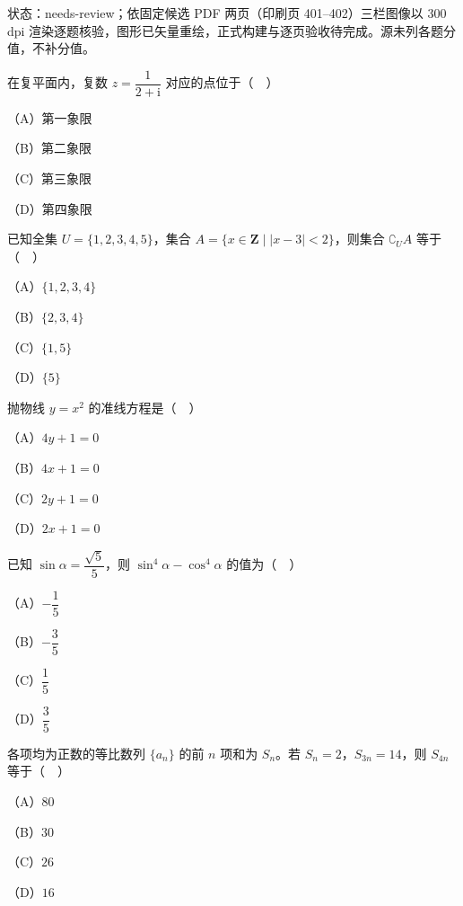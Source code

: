 

状态：needs-review；依固定候选 PDF 两页（印刷页 401–402）三栏图像以 300 dpi 渲染逐题核验，图形已矢量重绘，正式构建与逐页验收待完成。源未列各题分值，不补分值。


\begin{question}
在复平面内，复数 $z=\dfrac{1}{2+\mathrm i}$ 对应的点位于（　）

（A）第一象限

（B）第二象限

（C）第三象限

（D）第四象限

\end{question}
\begin{question}
已知全集 $U=\{1,2,3,4,5\}$，集合 $A=\{x\in\mathbf Z\mid |x-3|<2\}$，则集合 $\complement_UA$ 等于（　）

（A）$\{1,2,3,4\}$

（B）$\{2,3,4\}$

（C）$\{1,5\}$

（D）$\{5\}$

\end{question}
\begin{question}
抛物线 $y=x^2$ 的准线方程是（　）

（A）$4y+1=0$

（B）$4x+1=0$

（C）$2y+1=0$

（D）$2x+1=0$

\end{question}
\begin{question}
已知 $\sin\alpha=\dfrac{\sqrt5}{5}$，则 $\sin^4\alpha-\cos^4\alpha$ 的值为（　）

（A）$-\dfrac15$

（B）$-\dfrac35$

（C）$\dfrac15$

（D）$\dfrac35$

\end{question}
\begin{question}
各项均为正数的等比数列 $\{a_n\}$ 的前 $n$ 项和为 $S_n$。若 $S_n=2$，$S_{3n}=14$，则 $S_{4n}$ 等于（　）

（A）$80$

（B）$30$

（C）$26$

（D）$16$

\end{question}
